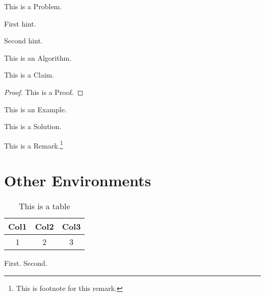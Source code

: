 \documentclass[12pt]{scrartcl}
\begin{document}
\begin{problem}
[Name]
This is a Problem.
\end{problem}
\begin{hints}
  \begin{hint}
    First hint.
  \end{hint}
  \begin{hint}
    Second hint.
  \end{hint}
\end{hints}

\begin{algorithm}
[Name]
This is an Algorithm.
\end{algorithm}

\begin{claim}
[Name]
This is a Claim.
\end{claim}

\begin{proof}
This is a Proof.
\end{proof}

\begin{example}
[Name]
This is an Example.
\end{example}

\begin{soln}
This is a Solution.
\end{soln}

\hrulebar

\begin{remark}
[Name]
  This is a Remark.\footnote{This is footnote for this remark.}
\end{remark}

\newpage

\section{Other Environments}


\begin{table}[htbp]
\label{tab:1}
\centering
\begin{tabular}{||c c c||}

\hline
Col1 & Col2 & Col3 \\ [0.5ex]
\hline\hline

1 & 2 & 3 \\
\hline

\end{tabular}
\caption{This is a table}
\end{table}

\begin{enumerate}[(a)]
  \ii First.
  \ii Second.
\end{enumerate}
\end{document}
